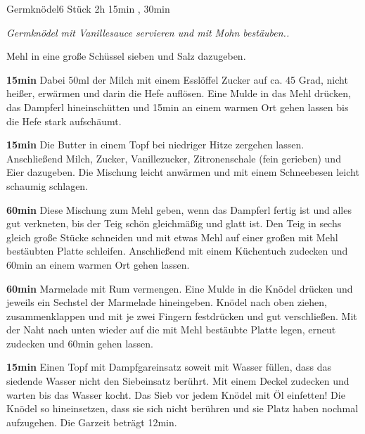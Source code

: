 \documentclass[../recipe-collections/cooking.tex]{subfiles}
\begin{document}
\begin{recipe}{Germknödel}{6 Stück }{2h 15min , 30min }

  \freeform{}\textit{Germknödel mit Vanillesauce servieren und mit Mohn bestäuben..}


  Mehl in eine große Schüssel sieben und Salz dazugeben.


  \textbf{15min}
  Dabei 50ml der Milch mit einem Esslöffel Zucker auf ca. 45 Grad, nicht heißer, erwärmen und darin die Hefe auflösen.
  Eine Mulde in das Mehl drücken, das Dampferl hineinschütten und 15min an einem warmen Ort gehen lassen bis die Hefe stark aufschäumt.


  \textbf{15min}
  Die Butter in einem Topf bei niedriger Hitze zergehen lassen.
  Anschließend Milch, Zucker, Vanillezucker, Zitronenschale (fein gerieben) und Eier dazugeben.
  Die Mischung leicht anwärmen und mit einem Schneebesen leicht schaumig schlagen.

  \newstep{}\textbf{60min}
  Diese Mischung zum Mehl geben, wenn das Dampferl fertig ist und alles gut verkneten, bis der Teig schön gleichmäßig und glatt ist.
  Den Teig in sechs gleich große Stücke schneiden und mit etwas Mehl auf einer großen mit Mehl bestäubten Platte schleifen.
  Anschließend mit einem Küchentuch zudecken und 60min an einem warmen Ort gehen lassen.


  \textbf{60min}
  Marmelade mit Rum vermengen.
  Eine Mulde in die Knödel drücken und jeweils ein Sechstel der Marmelade hineingeben.
  Knödel nach oben ziehen, zusammenklappen und mit je zwei Fingern festdrücken und gut verschließen.
  Mit der Naht nach unten wieder auf die mit Mehl bestäubte Platte legen, erneut zudecken und 60min gehen lassen.

  \newstep{}\textbf{15min}
  Einen Topf mit Dampfgareinsatz soweit mit Wasser füllen, dass das siedende Wasser nicht den Siebeinsatz berührt.
  Mit einem Deckel zudecken und warten bis das Wasser kocht.
  Das Sieb vor jedem Knödel mit Öl einfetten!
  Die Knödel so hineinsetzen, dass sie sich nicht berühren und sie Platz haben nochmal aufzugehen.
  Die Garzeit beträgt 12min.

  \freeform{}\hrulefill{}

\end{recipe}
\end{document}
